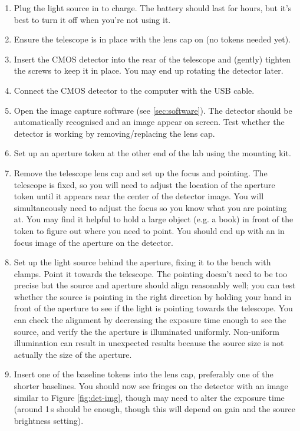 \documentclass[11pt]{article}
\begin{document}
\begin{enumerate}
    \item Plug the light source in to charge. The battery should last for hours, but it's best to turn it off when you're not using it.
    \item Ensure the telescope is in place with the lens cap on (no tokens needed yet).
    \item Insert the CMOS detector into the rear of the telescope and (gently) tighten the screws to keep it in place. You may end up rotating the detector later.
    \item Connect the CMOS detector to the computer with the USB cable.
    \item Open the image capture software (see \ref{sec:software}). The detector should be automatically recognised and an image appear on screen. Test whether the detector is working by removing/replacing the lens cap.
    \item Set up an aperture token at the other end of the lab using the mounting kit.
    \item Remove the telescope lens cap and set up the focus and pointing. The telescope is fixed, so you will need to adjust the location of the aperture token until it appears near the center of the detector image. You will simultaneously need to adjust the focus so you know what you are pointing at. You may find it helpful to hold a large object (e.g. a book) in front of the token to figure out where you need to point. You should end up with an in focus image of the aperture on the detector.
    \item Set up the light source behind the aperture, fixing it to the bench with clamps. Point it towards the telescope. The pointing doesn't need to be too precise but the source and aperture should align reasonably well; you can test whether the source is pointing in the right direction by holding your hand in front of the aperture to see if the light is pointing towards the telescope. You can check the alignment by decreasing the exposure time enough to see the source, and verify the the aperture is illuminated uniformly. Non-uniform illumination can result in unexpected results because the source size is not actually the size of the aperture.
    \item Insert one of the baseline tokens into the lens cap, preferably one of the shorter baselines. You should now see fringes on the detector with an image similar to Figure \ref{fig:det-img}, though may need to alter the exposure time (around 1\,s should be enough, though this will depend on gain and the source brightness setting).
\end{enumerate}
\end{document}
